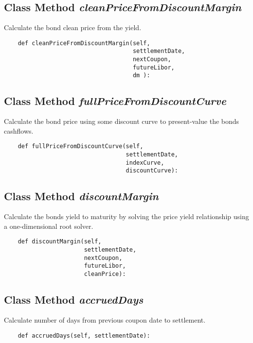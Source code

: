 \documentclass[twoside,11pt]{book}
\begin{document}
\subsection{Class Method {\it cleanPriceFromDiscountMargin}}
Calculate the bond clean price from the yield. 

\begin{lstlisting}
    def cleanPriceFromDiscountMargin(self, 
                                     settlementDate,
                                     nextCoupon,
                                     futureLibor,
                                     dm ):
\end{lstlisting}

\subsection{Class Method {\it fullPriceFromDiscountCurve}}
Calculate the bond price using some discount curve to present-value the bonds cashflows. 

\begin{lstlisting}
    def fullPriceFromDiscountCurve(self, 
                                   settlementDate,
                                   indexCurve,
                                   discountCurve):
\end{lstlisting}

\subsection{Class Method {\it discountMargin}}
Calculate the bonds yield to maturity by solving the price yield relationship using a one-dimensional root solver. 

\begin{lstlisting}
    def discountMargin(self, 
                       settlementDate,
                       nextCoupon, 
                       futureLibor,
                       cleanPrice):
\end{lstlisting}

\subsection{Class Method {\it accruedDays}}
Calculate number of days from previous coupon date to settlement.

\begin{lstlisting}
    def accruedDays(self, settlementDate):
\end{lstlisting}
\end{document}
